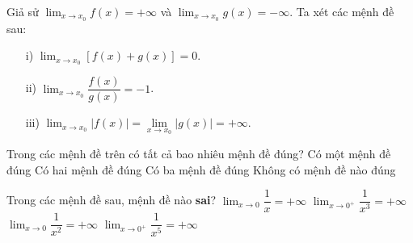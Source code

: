 \begin{ex}%
	Giả sử $\displaystyle \lim_{x \rightarrow x_0} f(x) = +\infty$ và $\displaystyle \lim_{x \rightarrow x_0} g(x) = -\infty$. Ta xét các mệnh đề sau:
	\begin{enumerate}
		\item[i)] $\displaystyle \lim_{x \rightarrow x_0} \left[f(x) + g(x)\right]  = 0$.
		\item[ii)] $\displaystyle \lim_{x \rightarrow x_0} \dfrac{f(x)}{g(x)}  = -1$.
		\item[iii)] $\displaystyle \lim_{x \rightarrow x_0} \left|f(x)\right|  = \lim\limits_{x\rightarrow x_0} \left|g(x)\right| = +\infty$.
	\end{enumerate}
	Trong các mệnh đề trên có tất cả bao nhiêu mệnh đề đúng?
	\choice
	{Có một mệnh đề đúng}
	{Có hai mệnh đề đúng}
	{Có ba mệnh đề đúng}
	{\True Không có mệnh đề nào đúng}
\end{ex}


\begin{ex}%
	Trong các mệnh đề sau, mệnh đề nào \textbf{sai}?
	\choice
	{\True $\displaystyle \lim_{x \rightarrow 0} \dfrac{1}{x} = +\infty$}
	{$\displaystyle \lim_{x \rightarrow 0^+} \dfrac{1}{x^3} = +\infty$}
	{$\displaystyle \lim_{x \rightarrow 0} \dfrac{1}{x^2} = +\infty$}
	{$\displaystyle \lim_{x \rightarrow 0^+} \dfrac{1}{x^5} = +\infty$}
\end{ex}

